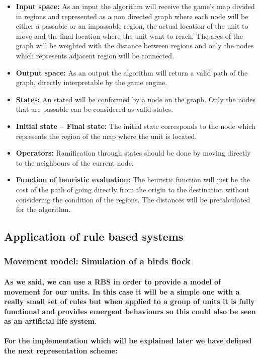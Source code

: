 \documentclass[a4paper,10pt]{article}
\newcommand{\p}[1]{\paragraph{\indent\textnormal{#1}}}
\begin{document}
    \begin{itemize}
     \item \textbf{Input space:} As an input the algorithm will receive the game's map divided in regions and represented as a non directed graph where each node will be either a passable or an impassable region, the actual location of the unit to move and the final location where the unit want to reach. The arcs of the graph will be weighted with the distance between regions and only the nodes which represents adjacent region will be connected.
     \item \textbf{Output space:} As an output the algorithm will return a valid path of the graph, directly interpretable by the game engine.
     \item \textbf{States:} An stated will be conformed by a node on the graph. Only the nodes that are passable can be considered as valid states. 
     \item \textbf{Initial state – Final state:} The initial state corresponds to the node which represents the region of the map where the unit is located.
     \item \textbf{Operators:} Ramification through states should be done by moving directly to the neighbours of the current node.
     \item \textbf{Function of heuristic evaluation:} The heuristic function will just be the cost of the path of going directly from the origin to the destination without considering the condition of the regions. The distances will be precalculated for the algorithm.
    \end{itemize}

  \subsection{Application of rule based systems}
  
    \subsubsection{Movement model: Simulation of a birds flock}

      \p{As we said, we can use a RBS in order to provide a model of movement for our units. In this case it will be a simple one with a really small set of rules but when applied to a group of units it is fully functional and provides emergent behaviours so this could also be seen as an \textbf{artificial life} system.}

      \p{For the implementation which will be explained later we have defined the next representation scheme:}
\end{document}
